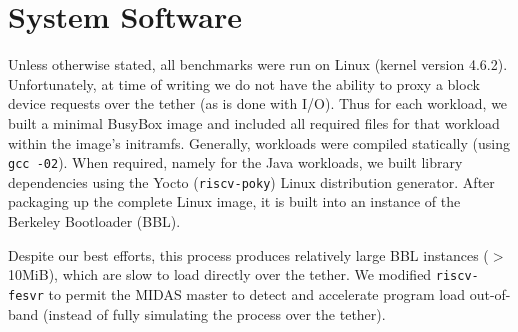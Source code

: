 %

\section{System Software}

Unless otherwise stated, all benchmarks were run on Linux (kernel version
4.6.2). Unfortunately, at time of writing we do not have the ability to proxy a
block device requests over the tether (as is done with I/O). Thus for each
workload, we built a minimal BusyBox image and included all required files for
that workload within the image's initramfs.  Generally, workloads were compiled
statically (using \texttt{gcc -02}). When required, namely for the Java workloads, we
built library dependencies using the Yocto (\texttt{riscv-poky}) Linux
distribution generator. After packaging up the complete Linux image, it is
built into an instance of the Berkeley Bootloader (BBL).

Despite our best efforts, this process produces relatively large BBL instances
($>$ 10MiB), which are slow to load directly over the tether.  We modified
\texttt{riscv-fesvr} to permit the MIDAS master to detect and accelerate program load
out-of-band (instead of fully simulating the process over the tether).

